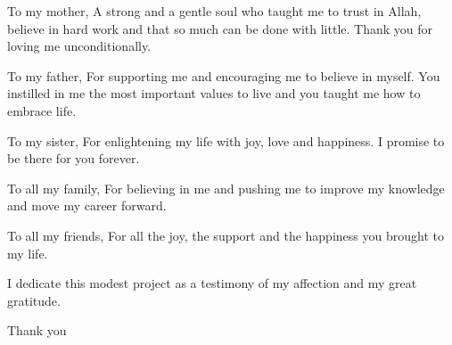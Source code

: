 
\begin{dedication} 

    To my mother,
    A strong and a gentle soul who taught me to trust in Allah, believe in hard work and
    that so much can be done with little. Thank you for loving me unconditionally.

    To my father,    
    For supporting me and encouraging me to believe in myself. You instilled in me the most
    important values to live and you taught me how to embrace life.
    
    To my sister,
    For enlightening my life with joy, love and happiness. I promise to be there for you
    forever.
    
    To all my family, 
    For believing in me and pushing me to improve my knowledge and move my career forward.
    
    To all my friends,
    For all the joy, the support and the happiness you brought to my life.
    
    I dedicate this modest project as a testimony of my affection and my great gratitude.    
    
    Thank you

\end{dedication}

